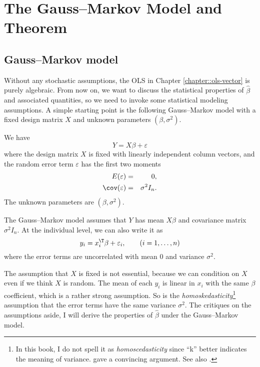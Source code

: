  
\chapter{The Gauss--Markov Model and Theorem}\label{chapter::gauss-markov}
 

\section{Gauss--Markov model}

Without any stochastic assumptions, the OLS in Chapter \ref{chapter::ols-vector} 
is purely algebraic. From now on, we want to discuss the statistical
properties of $\hat{\beta}$ and associated quantities, so we need
to invoke some statistical modeling assumptions. A simple starting point is the
following Gauss--Markov model with a fixed design matrix $X$ and unknown
parameters $(\beta,\sigma^{2})$. 

\begin{assumption}\label{assume::gm-model}
We have
\[
Y=X\beta+\varepsilon
\]
where the design matrix $X$ is fixed with linearly independent column vectors, and the random error term $\varepsilon$ has the first two moments
\begin{eqnarray*}
E(\varepsilon)  &=&  0,\\ 
\cov(\varepsilon) &=& \sigma^{2}I_{n} . 
\end{eqnarray*}
The unknown parameters are $ (\beta,   \sigma^{2} )$.
\end{assumption}

The Gauss--Markov model assumes that $Y$ has mean $X\beta$ and covariance
matrix $\sigma^{2}I_{n}.$ At the individual level, we can also write
it as
\[
y_{i}=x_{i}^{\T}\beta+\varepsilon_{i},\qquad(i=1,\ldots,n)
\]
where the error terms are uncorrelated with mean $0$ and variance
$\sigma^{2}$. 


The assumption that $X$ is fixed is not essential, because we can condition on $X$ even if we think $X$ is random. The mean of each $y_i$ is linear in $x_i$ with the same $\beta$ coefficient, which is a rather strong assumption. So is the {\it homoskedasticity}\footnote{In this book, I do not spell it as {\it homoscedasticity} since ``k'' better indicates the meaning of variance. \citet{mcculloch1985miscellanea} gave a convincing argument. See also \citet{paloyo2014did}.
} assumption that the error terms have the same variance $\sigma^2$. The critiques on the assumptions aside, I will  derive the properties of $\hat{\beta}$
under the Gauss--Markov model. 

